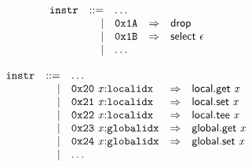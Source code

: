\vspace{1ex}

$$
\begin{array}{@{}l@{}rrlll@{}l@{}}
& {\mathtt{instr}} &::=& \dots \\ &&|&
\mathtt{0x1A} &\Rightarrow& \mathsf{drop} \\ &&|&
\mathtt{0x1B} &\Rightarrow& \mathsf{select}~\epsilon \\ &&|&
\dots \\
\end{array}
$$

\vspace{1ex}

$$
\begin{array}{@{}l@{}rrlll@{}l@{}}
& {\mathtt{instr}} &::=& \dots \\ &&|&
\mathtt{0x20}~{\mathit{x}}{:}{\mathtt{localidx}} &\Rightarrow& \mathsf{local.get}~{\mathit{x}} \\ &&|&
\mathtt{0x21}~{\mathit{x}}{:}{\mathtt{localidx}} &\Rightarrow& \mathsf{local.set}~{\mathit{x}} \\ &&|&
\mathtt{0x22}~{\mathit{x}}{:}{\mathtt{localidx}} &\Rightarrow& \mathsf{local.tee}~{\mathit{x}} \\ &&|&
\mathtt{0x23}~{\mathit{x}}{:}{\mathtt{globalidx}} &\Rightarrow& \mathsf{global.get}~{\mathit{x}} \\ &&|&
\mathtt{0x24}~{\mathit{x}}{:}{\mathtt{globalidx}} &\Rightarrow& \mathsf{global.set}~{\mathit{x}} \\ &&|&
\dots \\
\end{array}
$$

\vspace{1ex}

